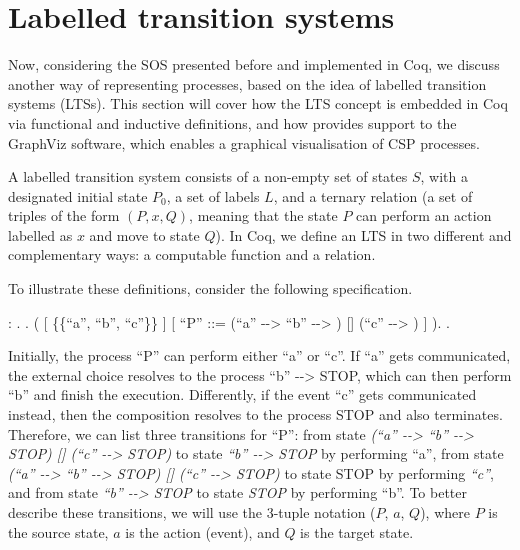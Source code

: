 \section{Labelled transition systems}
\label{section:lts}

Now, considering the SOS presented before and implemented in Coq, we discuss another way of representing processes, based on the idea of labelled transition systems (LTSs). This section will cover how the LTS concept is embedded in Coq via functional and inductive definitions, and how \CSPcoq{} provides support to the GraphViz software, which enables a graphical visualisation of CSP processes.

A labelled transition system consists of a non-empty set of states $ S $, with a designated initial state $ P_{0} $, a set of labels $ L $, and a ternary relation (a set of triples of the form $(P,x,Q)$, meaning that the state $ P $ can perform an action labelled as $ x $ and move to state $ Q $). In Coq, we define an LTS in two different and complementary ways: a computable function and a relation.

To illustrate these definitions, consider the following \CSPcoq{} specification.

\begin{coqdoccode}
	\coqdocnoindent
	  : .\coqdoceol
	\coqdocnoindent
	.\coqdoceol
	\coqdocindent{1.00em}
	 (\coqdoceol
	\coqdocindent{2.00em}
	\coqdoceol
	\coqdocindent{2.00em}
	[  \{\{``a'', ``b'', ``c''\}\} ]\coqdoceol
	\coqdocindent{2.00em}
	[ ``P'' ::= (``a'' -{}-> ``b'' -{}-> ) [] (``c'' -{}-> ) ]\coqdoceol
	\coqdocindent{1.00em}
	).\coqdoceol
	\coqdocnoindent
	.\coqdoceol
\end{coqdoccode}

Initially, the process ``P'' can perform either ``a'' or ``c''. If ``a'' gets communicated, the external choice resolves to the process ``b'' -{}-> STOP, which can then perform ``b'' and finish the execution. Differently, if the event ``c'' gets communicated instead, then the composition resolves to the process STOP and also terminates. Therefore, we can list three transitions for ``P'': from state \emph{(``a'' -{}-> ``b'' -{}-> STOP) [] (``c'' -{}-> STOP)} to state \emph{``b'' -{}-> STOP} by performing ``a'', from state \emph{(``a'' -{}-> ``b'' -{}-> STOP) [] (``c'' -{}-> STOP)} to state STOP by performing \emph{``c''}, and from state \emph{``b'' -{}-> STOP} to state \emph{STOP} by performing ``b''. To better describe these transitions, we will use the 3-tuple notation ($ P $, $ a $, $ Q $), where $ P $ is the source state, $ a $ is the action (event), and $ Q $ is the target state.

